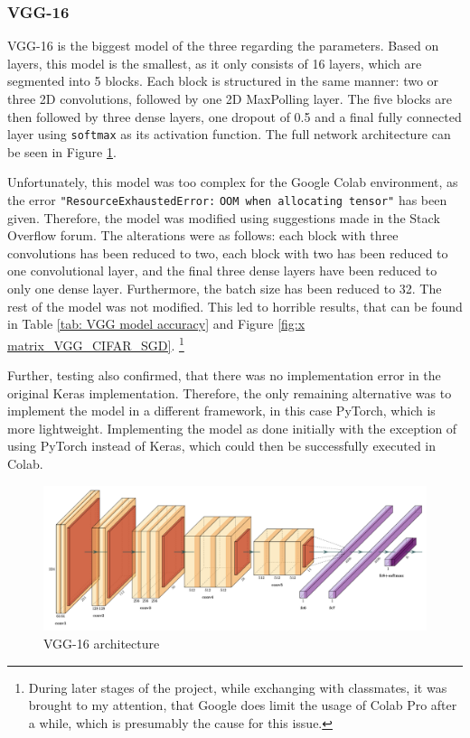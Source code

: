 \documentclass[conference]{IEEEtran}
\begin{document}
\subsubsection{VGG-16}
VGG-16 is the biggest model of the three regarding the parameters. 
Based on layers, this model is the smallest, as it only consists of 16 layers, which are segmented into 5 blocks. 
Each block is structured in the same manner: two or three 2D convolutions, followed by one 2D MaxPolling layer. 
The five blocks are then followed by three dense layers, one dropout of 0.5 and a final fully connected layer using \verb|softmax| as its activation function. 
The full network architecture can be seen in Figure \ref{fig:x VGG architecture}. \cite{simonyan_very_2015}

Unfortunately, this model was too complex for the Google Colab environment, as the error \verb|"ResourceExhaustedError:| \verb|OOM when allocating tensor"| has been given. Therefore, the model was modified using suggestions made in the Stack Overflow forum. \cite{gervais_answer_2019}
The alterations were as follows: each block with three convolutions has been reduced to two, each block with two has been reduced to one convolutional layer, and the final three dense layers have been reduced to only one dense layer. Furthermore, the batch size has been reduced to 32. 
The rest of the model was not modified. This led to horrible results, that can be found in Table \ref{tab: VGG model accuracy} and Figure \ref{fig:x matrix_VGG_CIFAR_SGD}. \footnote{During later stages of the project, while exchanging with classmates, it was brought to my attention, that Google  does limit the usage of Colab Pro after a while, which is presumably the cause for this issue. }

Further, testing also confirmed, that there was no implementation error in the original Keras implementation. 
Therefore, the only remaining alternative was to implement the model in a different framework, in this case PyTorch, which is more lightweight.
Implementing the model as done initially with the exception of using PyTorch instead of Keras, which could then be successfully executed in Colab.
\begin{figure}[!htbp]
    \centering
    \includegraphics[scale=0.07]{img/VGG.png}
    \caption{VGG-16 architecture \cite{noauthor_forks_nodate}}
    \label{fig:x VGG architecture}
\end{figure}
\end{document}
